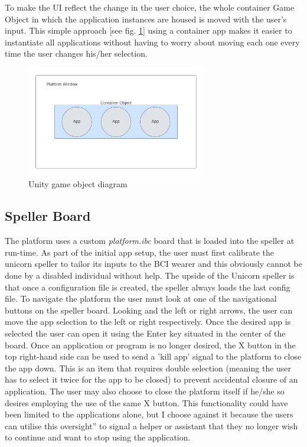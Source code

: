 To make the UI reflect the change in the user choice, the whole container Game Object in which the application instances are housed is moved with the user's input. This simple approach [see fig. \ref{fig:Unity object diagram}] using a container app makes it easier to instantiate all applications without having to worry about moving each one every time the user changes his/her selection.

\begin{figure}[H]
  \centering
  \includegraphics[width=0.7\textwidth]{Diagrams/Unity Objects Diagram.png}
  \caption{Unity game object diagram}
  \label{fig:Unity object diagram}
\end{figure}


\subsection{Speller Board}
 The platform uses a custom \textit{platform.ibc} board that is loaded into the speller at run-time. As part of the initial app setup, the user must first calibrate the unicorn speller to tailor its inputs to the BCI wearer and this obviously cannot be done by a disabled individual without help. The upside of the Unicorn speller is that once a configuration file is created, the speller always loads the last config file.
\vspace{\baselineskip}\newline
To navigate the platform the user must look at one of the navigational buttons on the speller board. Looking and the left or right arrows, the user can move the app selection to the left or right respectively. Once the desired app is selected the user can open it using the Enter key situated in the center of the board. Once an application or program is no longer desired, the X button in the top right-hand side can be used to send a 'kill app' signal to the platform to close the app down. This is an item that requires double selection (meaning the user has to select it twice for the app to be closed) to prevent accidental closure of an application. The user may also choose to close the platform itself if he/she so desires employing the use of the same X button. This functionality could have been limited to the applications alone, but I choose against it because the users can utilise this oversight” to signal a helper or assistant that they no longer wish to continue and want to stop using the application.



